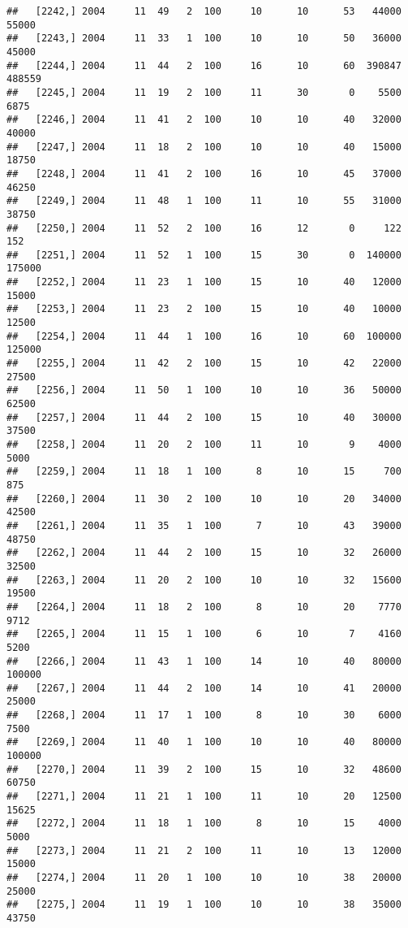 \documentclass{article}\usepackage[]{graphicx}\usepackage[]{color}
\makeatletter
\newenvironment{kframe}{%
 \def\at@end@of@kframe{}%
 \ifinner\ifhmode%
  \def\at@end@of@kframe{\end{minipage}}%
  \begin{minipage}{\columnwidth}%
 \fi\fi%
 \def\FrameCommand##1{\hskip\@totalleftmargin \hskip-\fboxsep
 \colorbox{shadecolor}{##1}\hskip-\fboxsep
     \hskip-\linewidth \hskip-\@totalleftmargin \hskip\columnwidth}%
 \MakeFramed {\advance\hsize-\width
   \@totalleftmargin\z@ \linewidth\hsize
   \@setminipage}}%
 {\par\unskip\endMakeFramed%
 \at@end@of@kframe}
\newenvironment{knitrout}{}{} %
\makeatother
\begin{document}
\begin{knitrout}
\begin{kframe}
\begin{verbatim}
##   [2242,] 2004     11  49   2  100     10      10      53   44000   55000
##   [2243,] 2004     11  33   1  100     10      10      50   36000   45000
##   [2244,] 2004     11  44   2  100     16      10      60  390847  488559
##   [2245,] 2004     11  19   2  100     11      30       0    5500    6875
##   [2246,] 2004     11  41   2  100     10      10      40   32000   40000
##   [2247,] 2004     11  18   2  100     10      10      40   15000   18750
##   [2248,] 2004     11  41   2  100     16      10      45   37000   46250
##   [2249,] 2004     11  48   1  100     11      10      55   31000   38750
##   [2250,] 2004     11  52   2  100     16      12       0     122     152
##   [2251,] 2004     11  52   1  100     15      30       0  140000  175000
##   [2252,] 2004     11  23   1  100     15      10      40   12000   15000
##   [2253,] 2004     11  23   2  100     15      10      40   10000   12500
##   [2254,] 2004     11  44   1  100     16      10      60  100000  125000
##   [2255,] 2004     11  42   2  100     15      10      42   22000   27500
##   [2256,] 2004     11  50   1  100     10      10      36   50000   62500
##   [2257,] 2004     11  44   2  100     15      10      40   30000   37500
##   [2258,] 2004     11  20   2  100     11      10       9    4000    5000
##   [2259,] 2004     11  18   1  100      8      10      15     700     875
##   [2260,] 2004     11  30   2  100     10      10      20   34000   42500
##   [2261,] 2004     11  35   1  100      7      10      43   39000   48750
##   [2262,] 2004     11  44   2  100     15      10      32   26000   32500
##   [2263,] 2004     11  20   2  100     10      10      32   15600   19500
##   [2264,] 2004     11  18   2  100      8      10      20    7770    9712
##   [2265,] 2004     11  15   1  100      6      10       7    4160    5200
##   [2266,] 2004     11  43   1  100     14      10      40   80000  100000
##   [2267,] 2004     11  44   2  100     14      10      41   20000   25000
##   [2268,] 2004     11  17   1  100      8      10      30    6000    7500
##   [2269,] 2004     11  40   1  100     10      10      40   80000  100000
##   [2270,] 2004     11  39   2  100     15      10      32   48600   60750
##   [2271,] 2004     11  21   1  100     11      10      20   12500   15625
##   [2272,] 2004     11  18   1  100      8      10      15    4000    5000
##   [2273,] 2004     11  21   2  100     11      10      13   12000   15000
##   [2274,] 2004     11  20   1  100     10      10      38   20000   25000
##   [2275,] 2004     11  19   1  100     10      10      38   35000   43750

\end{verbatim}
\end{kframe}
\end{knitrout}
\end{document}
